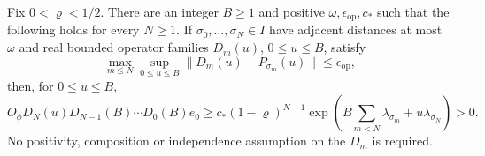 \begin{lemma}
  \label{L:raw-block-indexed-cone}
  Fix $0<\varrho<1/2$. There are an integer $B\ge1$ and positive
  $\omega,\epsilon_{\mathrm{op}},c_*$ such that the following holds
  for every $N\ge1$. If $\sigma_0,\ldots,\sigma_N\in I$ have
  adjacent distances at most $\omega$ and real bounded operator
  families $D_m(u)$, $0\le u\le B$, satisfy
  \[
    \max_{m\le N}\sup_{0\le u\le B}
    \|D_m(u)-P_{\sigma_m}(u)\|\le\epsilon_{\mathrm{op}},
  \]
  then, for $0\le u\le B$,
  \begin{equation}\label{E:raw-block-positive-product}
    O_\phi D_N(u)D_{N-1}(B)\cdots D_0(B)e_0
    \ge c_*(1-\varrho)^{N-1}
    \exp\left(B\sum_{m<N}\lambda_{\sigma_m}
    +u\lambda_{\sigma_N}\right)>0.
  \end{equation}
  No positivity, composition or independence assumption on the $D_m$
  is required.
\end{lemma}

